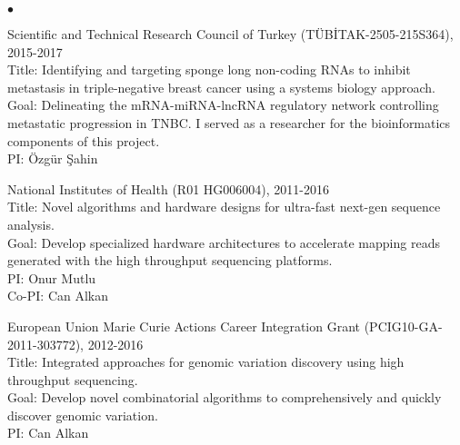 \documentclass[margin,line]{res}
\newenvironment{list2}{
  \begin{list}{$\bullet$}{%
      \setlength{\itemsep}{0.1cm}
      \setlength{\parsep}{0in} \setlength{\parskip}{0in}
      \setlength{\topsep}{0in} \setlength{\partopsep}{0in} 
      \setlength{\leftmargin}{0.2in}}}{\end{list}}
\begin{document}
\begin{resume}
\begin{list2}
                                       \item
                                         Scientific and Technical Research Council of Turkey (T\"{U}B\.{I}TAK-2505-215S364), 2015-2017\\
                                         Title: Identifying and targeting sponge long non-coding RNAs to inhibit metastasis in triple-negative breast cancer
                                         using a systems biology approach.\\
                                         Goal: Delineating the mRNA-miRNA-lncRNA regulatory network controlling metastatic progression in TNBC. I served as a researcher
                                         for the bioinformatics components of this project.\\
                                         PI: Özgür Şahin
                                       \item
                                         National Institutes of Health (R01 HG006004), 2011-2016\\
                                         Title: Novel algorithms and hardware designs for ultra-fast next-gen sequence analysis.\\
                                         Goal: Develop specialized hardware architectures to accelerate mapping reads generated with the high throughput sequencing platforms.\\
                                         PI: Onur Mutlu\\
                                         Co-PI: Can Alkan

                                       \item
                                         European Union Marie Curie Actions Career Integration Grant (PCIG10-GA-2011-303772),  2012-2016\\
                                         Title: Integrated approaches for genomic variation discovery using high throughput sequencing.\\
                                         Goal: Develop novel combinatorial algorithms to comprehensively and quickly discover genomic variation.\\
                                         PI: Can Alkan


\end{list2}
\end{resume}
\end{document}
